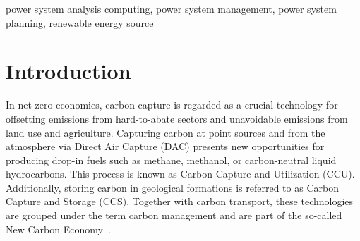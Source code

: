 \documentclass[conference]{IEEEtran}
\begin{document}
\begin{IEEEkeywords}
    power system analysis computing, power system management, power system planning, renewable energy source
\end{IEEEkeywords}


\section{Introduction}
\label{sec:introduction}

In net-zero economies, carbon capture is regarded as a crucial technology for offsetting emissions from hard-to-abate sectors and unavoidable emissions from land use and agriculture. Capturing carbon at point sources and from the atmosphere via Direct Air Capture (DAC) presents new opportunities for producing drop-in fuels such as methane, methanol, or carbon-neutral liquid hydrocarbons. This process is known as Carbon Capture and Utilization (CCU). Additionally, storing carbon in geological formations is referred to as Carbon Capture and Storage (CCS). Together with carbon transport, these technologies are grouped under the term carbon management and are part of the so-called New Carbon Economy~\cite{arniehellerNewCarbonEconomy2019}.
\end{document}
